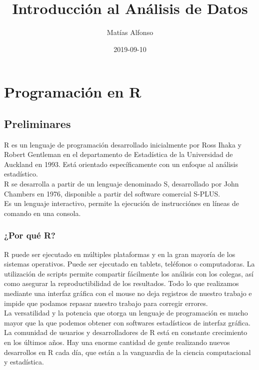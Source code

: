 \documentclass[spanish,]{book}
\title{Introducción al Análisis de Datos}
\author{Matías Alfonso}
\date{2019-09-10}
\begin{document}
\maketitle

{
\setcounter{tocdepth}{1}
\tableofcontents
}
\part{Programación en R}\label{part-programacion-en-r}

\chapter{Preliminares}\label{prelim}

R es un lenguaje de programación desarrollado inicialmente por Ross
Ihaka y Robert Gentleman en el departamento de Estadística de la
Universidad de Auckland en 1993. Está orientado específicamente con un
enfoque al análisis estadístico.\\
R se desarrolla a partir de un lenguaje denominado S, desarrollado por
John Chambers en 1976, disponible a partir del software comercial
S-PLUS.\\
Es un lenguaje interactivo, permite la ejecución de instrucciónes en
líneas de comando en una consola.

\section{¿Por qué R?}\label{por-que-r}

R puede ser ejecutado en múltiples plataformas y en la gran mayoría de
los sistemas operativos. Puede ser ejecutado en tablets, teléfonos o
computadoras. La utilización de scripts permite compartir fácilmente los
análisis con los colegas, así como asegurar la reproductibilidad de los
resultados. Todo lo que realizamos mediante una interfaz gráfica con el
mouse no deja registros de nuestro trabajo e impide que podamos repasar
nuestro trabajo para corregir errores.\\
La versatilidad y la potencia que otorga un lenguaje de programación es
mucho mayor que la que podemos obtener con softwares estadísticos de
interfaz gráfica.\\
La comunidad de usuarios y desarrolladores de R está en constante
crecimiento en los últimos años. Hay una enorme cantidad de gente
realizando nuevos desarrollos en R cada día, que están a la vanguardia
de la ciencia computacional y estadística.
\end{document}
